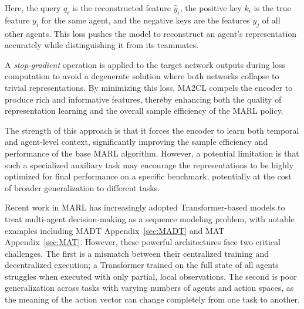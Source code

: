 Here, the query $q_i$ is the reconstructed feature $\hat{y}_i$, the positive key $k_i$ is the true feature $y_i$ for the same agent, and the negative keys are the features $y_j$ of all other agents. This loss pushes the model to reconstruct an agent's representation accurately while distinguishing it from its teammates. 

A \textit{stop-gradient} operation is applied to the target network outputs during loss computation to avoid a degenerate solution where both networks collapse to trivial representations. By minimizing this loss, MA2CL compels the encoder to produce rich and informative features, thereby enhancing both the quality of representation learning and the overall sample efficiency of the MARL policy.


The strength of this approach is that it forces the encoder to learn both temporal and agent-level context, significantly improving the sample efficiency and performance of the base MARL algorithm. However, a potential limitation is that such a specialized auxiliary task may encourage the representations to be highly optimized for final performance on a specific benchmark, potentially at the cost of broader generalization to different tasks.

Recent work in MARL has increasingly adopted Transformer-based models to treat multi-agent decision-making as a sequence modeling problem, with notable examples including MADT\parencite{MADT}  Appendix~\ref{sec:MADT}   and MAT\parencite{MAT}  Appendix~\ref{sec:MAT}. However, these powerful architectures face two critical challenges. The first is a mismatch between their centralized training and decentralized execution; a Transformer trained on the full state of all agents struggles when executed with only partial, local observations. The second is poor generalization across tasks with varying numbers of agents and action spaces, as the meaning of the action vector can change completely from one task to another.

